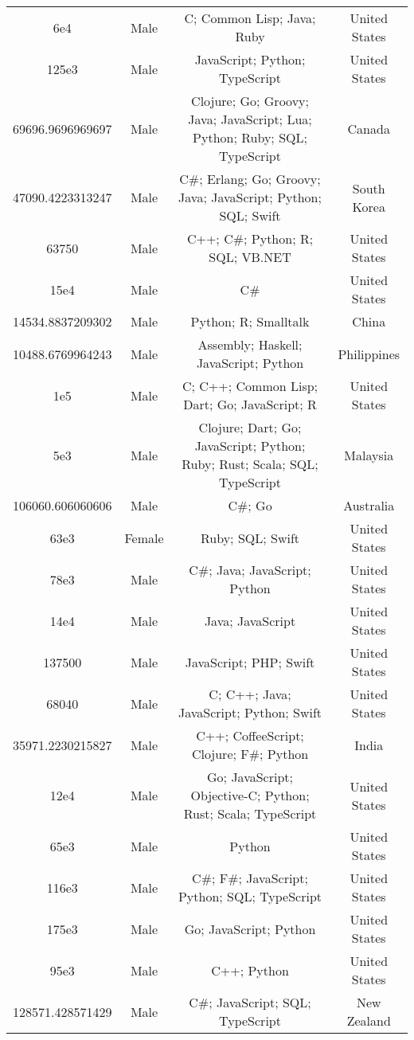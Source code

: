 \begin{center}
\begin{tabular}{ |c|c|c|c| }
6e4  &  Male  &  C; Common Lisp; Java; Ruby  &  United States  \\ 
125e3  &  Male  &  JavaScript; Python; TypeScript  &  United States  \\ 
69696.9696969697  &  Male  &  Clojure; Go; Groovy; Java; JavaScript; Lua; Python; Ruby; SQL; TypeScript  &  Canada  \\ 
47090.4223313247  &  Male  &  C\#; Erlang; Go; Groovy; Java; JavaScript; Python; SQL; Swift  &  South Korea  \\ 
63750  &  Male  &  C++; C\#; Python; R; SQL; VB.NET  &  United States  \\ 
15e4  &  Male  &  C\#  &  United States  \\ 
14534.8837209302  &  Male  &  Python; R; Smalltalk  &  China  \\ 
10488.6769964243  &  Male  &  Assembly; Haskell; JavaScript; Python  &  Philippines  \\ 
1e5  &  Male  &  C; C++; Common Lisp; Dart; Go; JavaScript; R  &  United States  \\ 
5e3  &  Male  &  Clojure; Dart; Go; JavaScript; Python; Ruby; Rust; Scala; SQL; TypeScript  &  Malaysia  \\ 
106060.606060606  &  Male  &  C\#; Go  &  Australia  \\ 
63e3  &  Female  &  Ruby; SQL; Swift  &  United States  \\ 
78e3  &  Male  &  C\#; Java; JavaScript; Python  &  United States  \\ 
14e4  &  Male  &  Java; JavaScript  &  United States  \\ 
137500  &  Male  &  JavaScript; PHP; Swift  &  United States  \\ 
68040  &  Male  &  C; C++; Java; JavaScript; Python; Swift  &  United States  \\ 
35971.2230215827  &  Male  &  C++; CoffeeScript; Clojure; F\#; Python  &  India  \\ 
12e4  &  Male  &  Go; JavaScript; Objective-C; Python; Rust; Scala; TypeScript  &  United States  \\ 
65e3  &  Male  &  Python  &  United States  \\ 
116e3  &  Male  &  C\#; F\#; JavaScript; Python; SQL; TypeScript  &  United States  \\ 
175e3  &  Male  &  Go; JavaScript; Python  &  United States  \\ 
95e3  &  Male  &  C++; Python  &  United States  \\ 
128571.428571429  &  Male  &  C\#; JavaScript; SQL; TypeScript  &  New Zealand  \\ 

\end{tabular}
\end{center}
